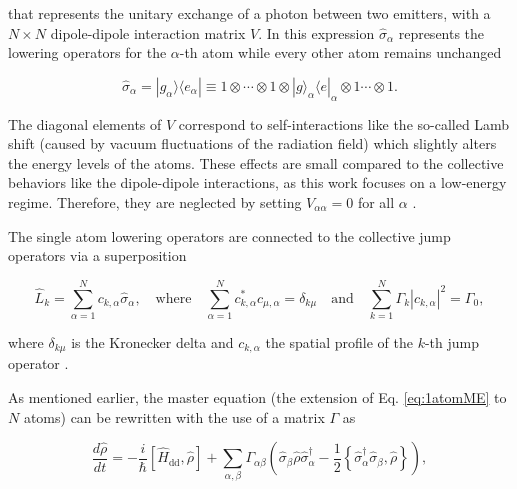\noindent
that represents the unitary exchange of a photon between two emitters, %
with a $N \times N$ dipole-dipole interaction matrix  \(V\).
In this expression $ \hat{\sigma}_{\alpha} $ represents the lowering operators for the $\alpha$-th atom
while every other atom remains unchanged

\begin{equation}
    \hat{\sigma}_\alpha = |g_\alpha\rangle\langle e_\alpha| \equiv 1 \otimes \cdots \otimes 1 \otimes |g\rangle_\alpha \langle e|_\alpha \otimes 1 \cdots \otimes 1.
\end{equation}

\noindent
The diagonal elements of \(V\) correspond to self-interactions
like the so-called Lamb shift (caused by vacuum fluctuations of the radiation field)
which slightly alters the energy levels of the atoms.
These effects are small compared to the collective behaviors like the dipole-dipole interactions,
as this work focuses on a low-energy regime.
Therefore, they are neglected by setting \(V_{\alpha \alpha} = 0\) for all \(\alpha\) \cite{Asenjo-Garcia2017, Ma2024}.

\noindent
The single atom lowering operators are connected to the collective jump operators via a superposition

\begin{equation}
    \hat{L}_k = \sum_{\alpha=1}^{N} c_{k, \alpha} \hat{\sigma}_{\alpha},
    \quad \text{where} \quad
    \sum_{\alpha=1}^{N} c_{k, \alpha}^* c_{\mu, \alpha} = \delta_{k\mu}
    \quad \text{and} \quad
    \sum_{k=1}^{N} \Gamma_k |c_{k,\alpha}|^2 = \Gamma_0,
\end{equation}

\noindent
where $\delta_{k\mu}$ is the Kronecker delta and $c_{k,\alpha}$ the spatial profile of the $k$-th jump operator \cite{Masson2022}.

\noindent

\noindent
As mentioned earlier,
the master equation (the extension of Eq. \eqref{eq:1atomME} to $N$ atoms)
can be rewritten with the use of a matrix $\Gamma$ as \cite{Clemens2003}

\begin{equation}\label{eq:QuantumOptical_ME}
\frac{d\hat{\rho}}{dt} = -\frac{i}{\hbar} [\hat{H}_{\text{dd}}, \hat{\rho}] + \sum_{\alpha,\beta} \Gamma_{\alpha\beta} \left( \hat{\sigma}_{\beta} \hat{\rho} \hat{\sigma}_{\alpha}^\dagger - \frac{1}{2} \left\{ \hat{\sigma}_{\alpha}^\dagger \hat{\sigma}_{\beta}, \hat{\rho} \right\} \right) ,
\end{equation}

